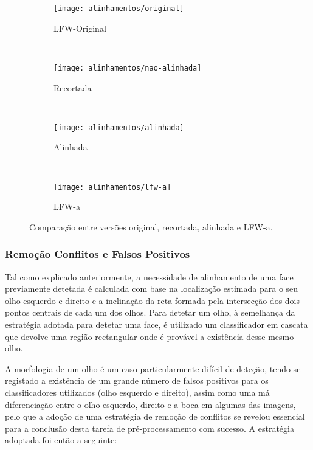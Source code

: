 \begin{figure}[t]
        \centering
        \begin{subfigure}[b]{0.2\textwidth}
                \centering
                \texttt{[image: alinhamentos/original]}
                \caption{LFW-Original}
                \label{fig:alinha_original}
        \end{subfigure}%
        ~ 
        \begin{subfigure}[b]{0.2\textwidth}
                \centering
                \texttt{[image: alinhamentos/nao-alinhada]}
                \caption{Recortada}
                \label{fig:alinha_nao-alinhada}
        \end{subfigure}
        ~ 
        \begin{subfigure}[b]{0.2\textwidth}
                \centering
                \texttt{[image: alinhamentos/alinhada]}
                \caption{Alinhada}
                \label{fig:alinha_alinhada}
        \end{subfigure}
        ~ 
        \begin{subfigure}[b]{0.2\textwidth}
                \centering
                \texttt{[image: alinhamentos/lfw-a]}
                \caption{LFW-a}
                \label{fig:alinha_lfw-a}
        \end{subfigure}
        \caption{Comparação entre versões original, recortada, alinhada e LFW-a.}\label{fig:alinhamentos}
\end{figure}

\subsubsection*{Remoção Conflitos e Falsos Positivos}
Tal como explicado anteriormente, a necessidade de alinhamento de uma face previamente detetada é calculada com base na localização estimada para o seu olho esquerdo e direito e a inclinação da reta formada pela intersecção dos dois pontos centrais de cada um dos olhos. Para detetar um olho, à semelhança da estratégia adotada para detetar uma face, é utilizado um classificador em cascata que devolve uma região rectangular onde é provável a existência desse mesmo olho. 

A morfologia de um olho é um caso particularmente difícil de deteção, tendo-se registado a existência de um grande número de falsos positivos para os classificadores utilizados (olho esquerdo e direito), assim como uma má diferenciação entre o olho esquerdo, direito e a boca em algumas das imagens, pelo que a adoção de uma estratégia de remoção de conflitos se revelou essencial para a conclusão desta tarefa de pré-processamento com sucesso. A estratégia adoptada foi então a seguinte:

